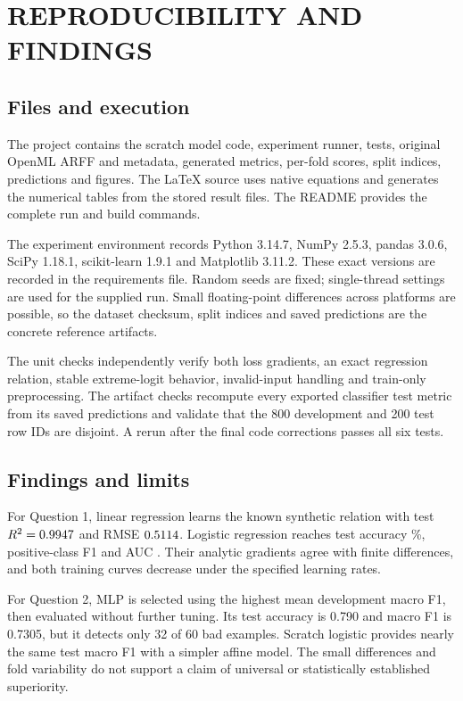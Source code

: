 
\clearpage
\chapter{REPRODUCIBILITY AND FINDINGS}
\section{Files and execution}
The project contains the scratch model code, experiment runner, tests, original OpenML ARFF and metadata, generated metrics, per-fold scores, split indices, predictions and figures. The LaTeX source uses native equations and generates the numerical tables from the stored result files. The README provides the complete run and build commands.

The experiment environment records Python 3.14.7, NumPy 2.5.3, pandas 3.0.6, SciPy 1.18.1, scikit-learn 1.9.1 and Matplotlib 3.11.2. These exact versions are recorded in the requirements file. Random seeds are fixed; single-thread settings are used for the supplied run. Small floating-point differences across platforms are possible, so the dataset checksum, split indices and saved predictions are the concrete reference artifacts.

The unit checks independently verify both loss gradients, an exact regression relation, stable extreme-logit behavior, invalid-input handling and train-only preprocessing. The artifact checks recompute every exported classifier test metric from its saved predictions and validate that the 800 development and 200 test row IDs are disjoint. A rerun after the final code corrections passes all six tests.

\section{Findings and limits}
For Question 1, linear regression learns the known synthetic relation with test $R^2=0.9947$ and RMSE $0.5114$. Logistic regression reaches test accuracy \LogAccuracy\%, positive-class F1 \LogFOne{} and AUC \LogAUC{}. Their analytic gradients agree with finite differences, and both training curves decrease under the specified learning rates.

For Question 2, MLP is selected using the highest mean development macro F1, then evaluated without further tuning. Its test accuracy is 0.790 and macro F1 is 0.7305, but it detects only 32 of 60 bad examples. Scratch logistic provides nearly the same test macro F1 with a simpler affine model. The small differences and fold variability do not support a claim of universal or statistically established superiority.

